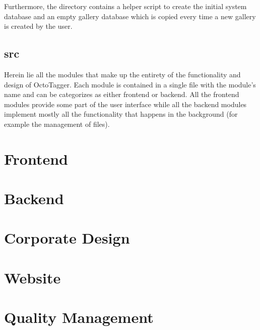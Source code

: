 Furthermore, the directory contains a helper script to create the initial
system database and an empty gallery database which is copied every time a new
gallery is created by the user.

\subsection{src}
Herein lie all the modules that make up the entirety of the functionality and
design of OctoTagger. Each module is contained in a single file with the
module's name and can be categorizes as either frontend or backend. All the
frontend modules provide some part of the user interface while all the backend
modules implement mostly all the functionality that happens in the background
(for example the management of files).


\section{Frontend}
%
\section{Backend}
%

\section{Corporate Design}
%
\section{Website}
%

\section{Quality Management}
\def \kapitelautor {Julian Lorenz}
